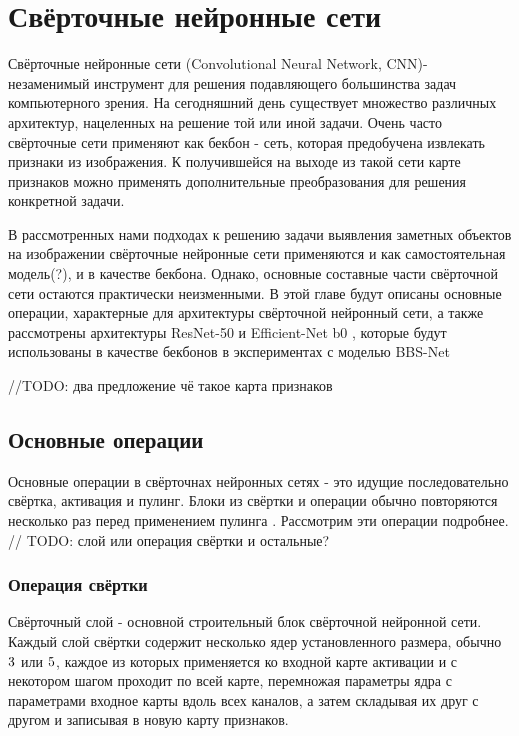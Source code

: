 \section{Свёрточные нейронные сети}


Свёрточные нейронные сети (Convolutional Neural Network, CNN)- незаменимый инструмент для решения подавляющего большинства задач компьютерного зрения. 
На сегодняшний день существует множество различных архитектур, нацеленных на решение той или иной задачи. 
Очень часто свёрточные сети применяют как бекбон - сеть, которая предобучена извлекать признаки из изображения. К получившейся 
на выходе из такой сети карте признаков можно применять дополнительные преобразования для решения конкретной задачи. 

В рассмотренных нами подходах к решению задачи выявления заметных объектов на изображении свёрточные нейронные сети 
применяются и как самостоятельная модель(?), и в качестве бекбона. Однако, основные составные части свёрточной сети 
остаются практически неизменными. В этой главе будут описаны основные операции, характерные для архитектуры свёрточной нейронный сети,
а также рассмотрены архитектуры ResNet-50\cite{ResNet} и Efficient-Net b0 \cite{Efficientnet}, которые будут использованы в качестве 
бекбонов в экспериментах с моделью BBS-Net \cite{BBS}

//TODO: два предложение чё такое карта признаков

\subsection{Основные операции}

Основные операции в свёрточнах нейронных сетях - это идущие последовательно свёртка, активация и пулинг. Блоки из свёртки и операции
обычно повторяются несколько раз перед применением пулинга \cite{ResNet}. Рассмотрим эти операции подробнее.
// TODO: слой или операция свёртки и остальные? 

\subsubsection{Операция свёртки}

Свёрточный слой - основной строительный блок свёрточной нейронной сети. Каждый слой свёртки содержит несколько ядер установленного размера,
обычно $3 \time 3$ или $5 \time 5$, каждое из которых применяется ко входной карте активации и с некотором шагом проходит по всей карте,
перемножая параметры ядра с параметрами входное карты вдоль всех каналов, а затем складывая их друг с другом и записывая в новую карту признаков.

